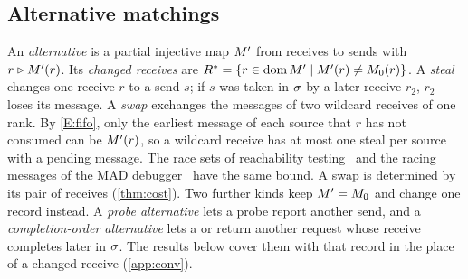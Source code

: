 \subsection{Alternative matchings}

An \emph{alternative} is a partial injective map $M'$ from receives to sends with
$r\mathrel{\triangleright}M'(r)$. Its \emph{changed receives} are
$R^{*}=\{r\in\mathrm{dom}\,M' \mid M'(r)\ne M_0(r)\}$. A \emph{steal} changes one
receive $r$ to a send $s$; if $s$ was taken in $\sigma$ by a later receive $r_2$, $r_2$ loses its message.
A \emph{swap} exchanges the messages of two wildcard receives of one rank. By
\ref{E:fifo}, only the earliest message of each source that $r$ has not consumed can be
$M'(r)$, so a wildcard receive has at most one steal per source with a pending
message. The race sets of reachability testing~\citep{lei06reachability} and the racing
messages of the MAD debugger~\citep{kranzlmueller00thesis} have the same bound. A swap is
determined by its pair of receives (\cref{thm:cost}).
Two further kinds keep $M'=M_0$ and change one record instead. A \emph{probe
alternative} lets a probe report another send, and a \emph{completion-order alternative} lets
a  or  return another request whose receive completes later in
$\sigma$. The results below cover them with that record in the place of a changed receive
(\cref{app:conv}).
